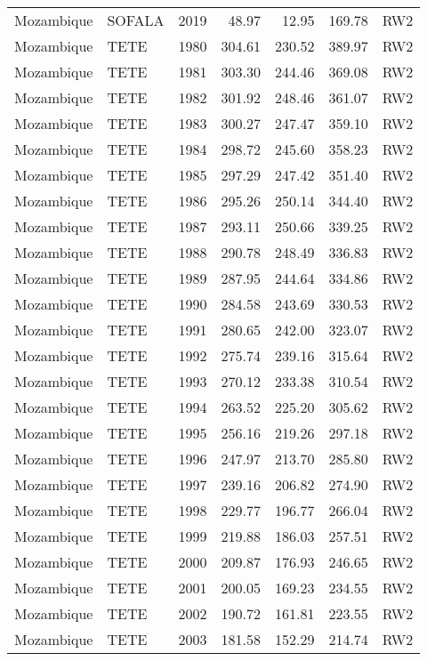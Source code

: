 \begin{longtable}{lllrrrl}
  Mozambique & SOFALA & 2019 & 48.97 & 12.95 & 169.78 & RW2 \\ 
  Mozambique & TETE & 1980 & 304.61 & 230.52 & 389.97 & RW2 \\ 
  Mozambique & TETE & 1981 & 303.30 & 244.46 & 369.08 & RW2 \\ 
  Mozambique & TETE & 1982 & 301.92 & 248.46 & 361.07 & RW2 \\ 
  Mozambique & TETE & 1983 & 300.27 & 247.47 & 359.10 & RW2 \\ 
  Mozambique & TETE & 1984 & 298.72 & 245.60 & 358.23 & RW2 \\ 
  Mozambique & TETE & 1985 & 297.29 & 247.42 & 351.40 & RW2 \\ 
  Mozambique & TETE & 1986 & 295.26 & 250.14 & 344.40 & RW2 \\ 
  Mozambique & TETE & 1987 & 293.11 & 250.66 & 339.25 & RW2 \\ 
  Mozambique & TETE & 1988 & 290.78 & 248.49 & 336.83 & RW2 \\ 
  Mozambique & TETE & 1989 & 287.95 & 244.64 & 334.86 & RW2 \\ 
  Mozambique & TETE & 1990 & 284.58 & 243.69 & 330.53 & RW2 \\ 
  Mozambique & TETE & 1991 & 280.65 & 242.00 & 323.07 & RW2 \\ 
  Mozambique & TETE & 1992 & 275.74 & 239.16 & 315.64 & RW2 \\ 
  Mozambique & TETE & 1993 & 270.12 & 233.38 & 310.54 & RW2 \\ 
  Mozambique & TETE & 1994 & 263.52 & 225.20 & 305.62 & RW2 \\ 
  Mozambique & TETE & 1995 & 256.16 & 219.26 & 297.18 & RW2 \\ 
  Mozambique & TETE & 1996 & 247.97 & 213.70 & 285.80 & RW2 \\ 
  Mozambique & TETE & 1997 & 239.16 & 206.82 & 274.90 & RW2 \\ 
  Mozambique & TETE & 1998 & 229.77 & 196.77 & 266.04 & RW2 \\ 
  Mozambique & TETE & 1999 & 219.88 & 186.03 & 257.51 & RW2 \\ 
  Mozambique & TETE & 2000 & 209.87 & 176.93 & 246.65 & RW2 \\ 
  Mozambique & TETE & 2001 & 200.05 & 169.23 & 234.55 & RW2 \\ 
  Mozambique & TETE & 2002 & 190.72 & 161.81 & 223.55 & RW2 \\ 
  Mozambique & TETE & 2003 & 181.58 & 152.29 & 214.74 & RW2 \\ 

\end{longtable}
